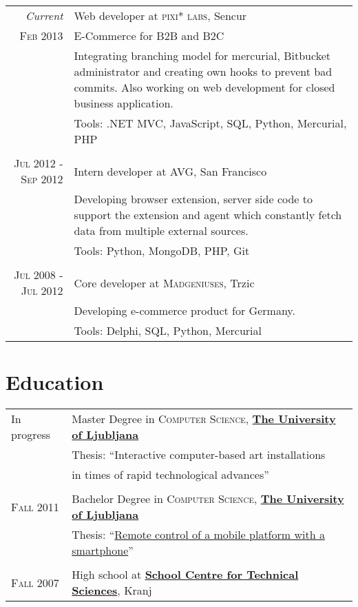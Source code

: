 \documentclass[a4paper,10pt]{article} %
\begin{document}
\begin{tabular}{r|p{10cm}}
\emph{Current} & Web developer at \textsc{pixi* labs}, Sencur \\
\textsc{Feb 2013} & E-Commerce for B2B and B2C\\
& \footnotesize{Integrating branching model for mercurial, Bitbucket administrator and creating own hooks to prevent bad commits. Also working on web development for closed business application.} \\
& \footnotesize{Tools: .NET MVC, JavaScript, SQL, Python, Mercurial, PHP} \\
\multicolumn{2}{c}{} \\

\textsc{Jul 2012 - Sep 2012} & Intern developer at \textsc{AVG}, San Francisco \emph{}\\
& \footnotesize{Developing browser extension, server side code to support the extension and agent which constantly fetch data from multiple external sources.} \\
& \footnotesize{Tools: Python, MongoDB, PHP, Git} \\ 
\multicolumn{2}{c}{} \\

\textsc{Jul 2008 - Jul 2012} & Core developer at \textsc{Madgeniuses}, Trzic \emph{}\\
& \footnotesize{Developing e-commerce product for Germany.}\\
& \footnotesize{Tools: Delphi, SQL, Python, Mercurial}\\
\end{tabular}


\section{Education}

\begin{tabular}{p{2cm}l}	
\hfill In progress & Master Degree in \textsc{Computer Science}, \href{www.fri.uni-lj.si}{\textbf{The University of Ljubljana}} \\
& Thesis: ``Interactive computer-based art installations\\ & \hphantom{Thesis: ``}in times of rapid technological advances'' \\
\\

\hfill \textsc{Fall} 2011 & Bachelor Degree in \textsc{Computer Science}, \href{www.fri.uni-lj.si}{\textbf{The University of Ljubljana}} \\
& Thesis: ``\href{https://github.com/majcn/roomba}{Remote control of a mobile platform with a smartphone}'' \\
\\

\hfill \textsc{Fall} 2007 & High school at \href{http://www.sckr.si/}{\textbf{School Centre for Technical Sciences}}, Kranj\\
\end{tabular}
\end{document}
